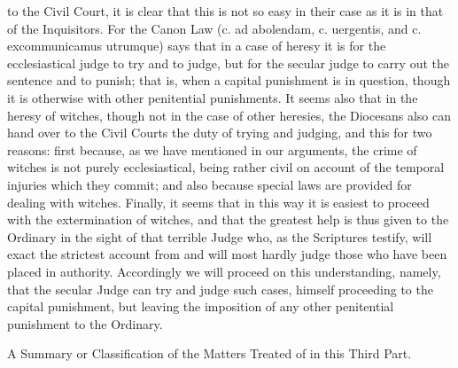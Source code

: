        to the Civil Court, it is clear that this is not so easy in their case as it is in that of the
       Inquisitors. For the Canon Law (c. ad abolendam, c. uergentis, and c. excommunicamus
       utrumque) says that in a case of heresy it is for the ecclesiastical judge to try and to judge,
       but for the secular judge to carry out the sentence and to punish; that is, when a capital
       punishment is in question, though it is otherwise with other penitential punishments.
             It seems also that in the heresy of witches, though not in the case of other heresies, the
       Diocesans also can hand over to the Civil Courts the duty of trying and judging, and this for
       two reasons: first because, as we have mentioned in our arguments, the crime of witches is
       not purely ecclesiastical, being rather civil on account of the temporal injuries which they
       commit; and also because special laws are provided for dealing with witches.
            Finally, it seems that in this way it is easiest to proceed with the extermination of
       witches, and that the greatest help is thus given to the Ordinary in the sight of that terrible
       Judge who, as the Scriptures testify, will exact the strictest account from and will most
       hardly judge those who have been placed in authority. Accordingly we will proceed on this
       understanding, namely, that the secular Judge can try and judge such cases, himself
       proceeding to the capital punishment, but leaving the imposition of any other penitential
       punishment to the Ordinary.

                     A Summary or Classification of the Matters Treated of in this Third Part.

